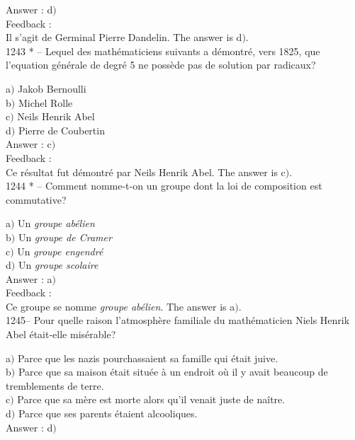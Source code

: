 ﻿\documentclass[letterpaper, 12pt]{article}
\begin{document}
Answer : d$)$\\

Feedback : \\
Il s'agit de Germinal Pierre Dandelin.
The answer is d$)$.\\

1243 * -- Lequel des math\'ematiciens suivants a d\'emontr\'e, vers
1825, que l'equation g\'en\'erale de degr\'e 5 ne poss\`ede pas de
solution par radicaux?

a$)$ Jakob Bernoulli  \\
b$)$ Michel Rolle \\
c$)$ Neils Henrik Abel \\
d$)$ Pierre de Coubertin\\

Answer : c$)$\\

Feedback : \\
Ce r\'esultat fut d\'emontr\'e par Neils Henrik Abel.
The answer is c$)$.\\

1244 * -- Comment nomme-t-on un groupe dont la loi de composition
est commutative?

a$)$ Un {\sl groupe ab\'elien}  \\
b$)$ Un {\sl groupe de Cramer} \\
c$)$ Un {\sl groupe engendr\'e} \\
d$)$ Un {\sl groupe scolaire}\\

Answer : a$)$\\

Feedback : \\
Ce groupe se nomme {\sl groupe ab\'elien}.
The answer is a$)$.\\

1245-- Pour quelle raison l'atmosph\`ere familiale du
math\'ematicien Niels Henrik Abel \'etait-elle mis\'erable?

a$)$ Parce que les nazis pourchassaient sa famille qui \'etait juive. \\
b$)$ Parce que sa maison \'etait situ\'ee \`a un endroit o\`u il y avait
beaucoup de tremblements de terre. \\
c$)$ Parce que sa m\`ere est morte alors qu'il venait juste de na\^itre. \\
d$)$ Parce que ses parents \'etaient alcooliques.  \\

Answer : d$)$\\
\end{document}
